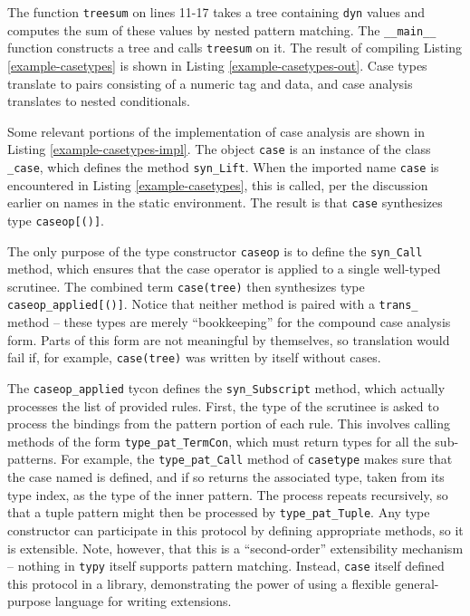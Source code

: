 \documentclass{sigplanconf}
\newcommand{\lip}[1]{\lstinline[language=Python,basicstyle=\ttfamily\small,deletendkeywords={tuple,buffer,map}]{#1}}
\begin{document}
The function \lip{treesum} on lines 11-17 takes a tree containing \lip{dyn} values and computes the sum of these values by nested pattern matching. The \lip{__main__} function constructs a tree and calls \lip{treesum} on it. The result of compiling Listing \ref{example-casetypes} is shown in Listing \ref{example-casetypes-out}. Case types translate to pairs consisting of a numeric tag and data, and case analysis translates to nested conditionals.

Some relevant portions of the implementation of case analysis are shown in Listing \ref{example-casetypes-impl}. The object \lip{case} is an instance of the class \lip{_case}, which defines the method \lip{syn_Lift}. When the imported name \lip{case} is encountered in Listing \ref{example-casetypes}, this is called, per the discussion earlier on names in the static environment. The result is that \lip{case} synthesizes type \lip{caseop[()]}.

The only purpose of the type constructor \lip{caseop} is to define the \lip{syn_Call} method, which ensures that the case operator is applied to a single well-typed scrutinee. The combined term \lip{case(tree)} then synthesizes type \lip{caseop_applied[()]}. Notice that neither method is paired with a \lip{trans_} method -- these types are merely ``bookkeeping'' for the compound case analysis form. Parts of this form are not meaningful by themselves, so translation would fail if, for example, \lip{case(tree)} was written by itself without cases.

The \lip{caseop_applied} tycon defines the \lip{syn_Subscript} method, which actually processes the list of provided rules. First, the type of the scrutinee is asked to process the bindings from the pattern portion of each rule. This involves calling methods of the form \lip{type_pat_TermCon}, which must return types for all the sub-patterns. For example, the \lip{type_pat_Call} method of \lip{casetype} makes sure that the case named is defined, and if so returns the associated type, taken from its type index, as the type of the inner pattern. The process repeats recursively, so that a tuple pattern might then be processed by \lip{type_pat_Tuple}. Any type constructor can participate in this protocol by defining appropriate methods, so it is extensible. Note, however, that this is a ``second-order'' extensibility mechanism -- nothing in \verb|typy| itself supports pattern matching. Instead, \lip{case} itself defined this protocol in a library, demonstrating the power of using a flexible general-purpose language for writing extensions.
\end{document}

